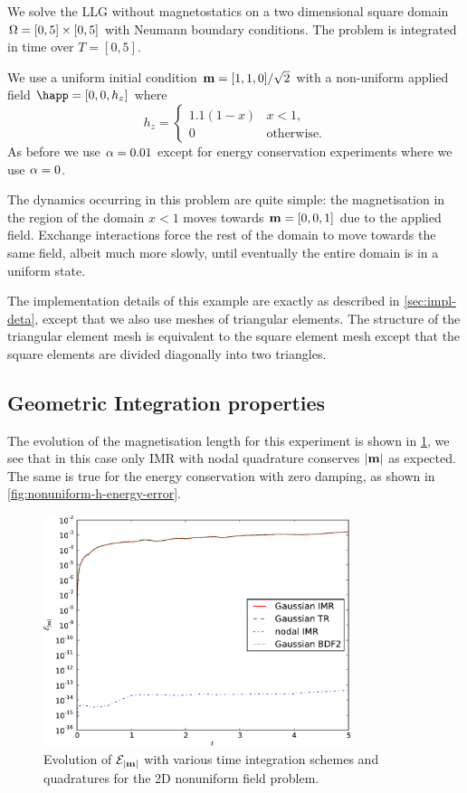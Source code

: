 We solve the LLG without magnetostatics on a two dimensional square domain $\Omega = [0,5] \times [0,5]$ with Neumann boundary conditions.
The problem is integrated in time over $T = [0, 5]$.

We use a uniform initial condition $\boldsymbol{\mathrm{m}} = [1, 1, 0]/\sqrt{2}$ with a non-uniform applied field $\happ = [0, 0, h_z]$ where
\begin{equation}
  h_z =
  \begin{cases}
    1.1 (1 -  x) & x  < 1, \\
    0 & \mathrm{otherwise}.
  \end{cases}
\end{equation}
As before we use $\alpha = 0.01$ except for energy conservation experiments where we use $\alpha = 0$.

The dynamics occurring in this problem are quite simple: the magnetisation in the region of the domain $x<1$ moves towards $\boldsymbol{\mathrm{m}} = [0, 0, 1]$ due to the applied field.
Exchange interactions force the rest of the domain to move towards the same field, albeit much more slowly, until eventually the entire domain is in a uniform state.

The implementation details of this example are exactly as described in \cref{sec:impl-deta}, except that we also use meshes of triangular elements.
The structure of the triangular element mesh is equivalent to the square element mesh except that the square elements are divided diagonally into two triangles.


\subsection{Geometric Integration properties}


The evolution of the magnetisation length for this experiment is shown in \cref{fig:nonuniform-h-ml-error}, we see that in this case only IMR with nodal quadrature conserves $\left|{\boldsymbol{\mathrm{m}}} \right|$ as expected.
The same is true for the energy conservation with zero damping, as shown in \cref{fig:nonuniform-h-energy-error}.

\begin{figure}
  \centering
  \includegraphics[width=0.8\textwidth]
  {plots/nonuniform-h-ml/mlengtherrormaxesvstimes.pdf}
  \caption{
    Evolution of $\mathcal{E}_{\left|{\boldsymbol{\mathrm{m}}} \right|}$
    with various time integration schemes and quadratures
    for the 2D nonuniform field problem.
  }
  \label{fig:nonuniform-h-ml-error}
\end{figure}


